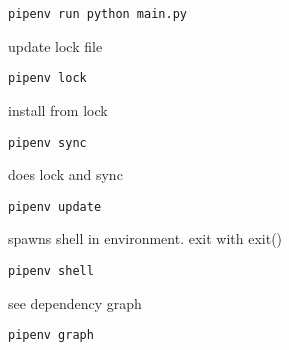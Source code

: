 \begin{verbatim}
pipenv run python main.py
\end{verbatim}

update lock file
\begin{verbatim}
pipenv lock
\end{verbatim}

install from lock
\begin{verbatim}
pipenv sync
\end{verbatim}

does lock and sync
\begin{verbatim}
pipenv update
\end{verbatim}

spawns shell in environment. exit with exit()
\begin{verbatim}
pipenv shell
\end{verbatim}

see dependency graph
\begin{verbatim}
pipenv graph
\end{verbatim}

